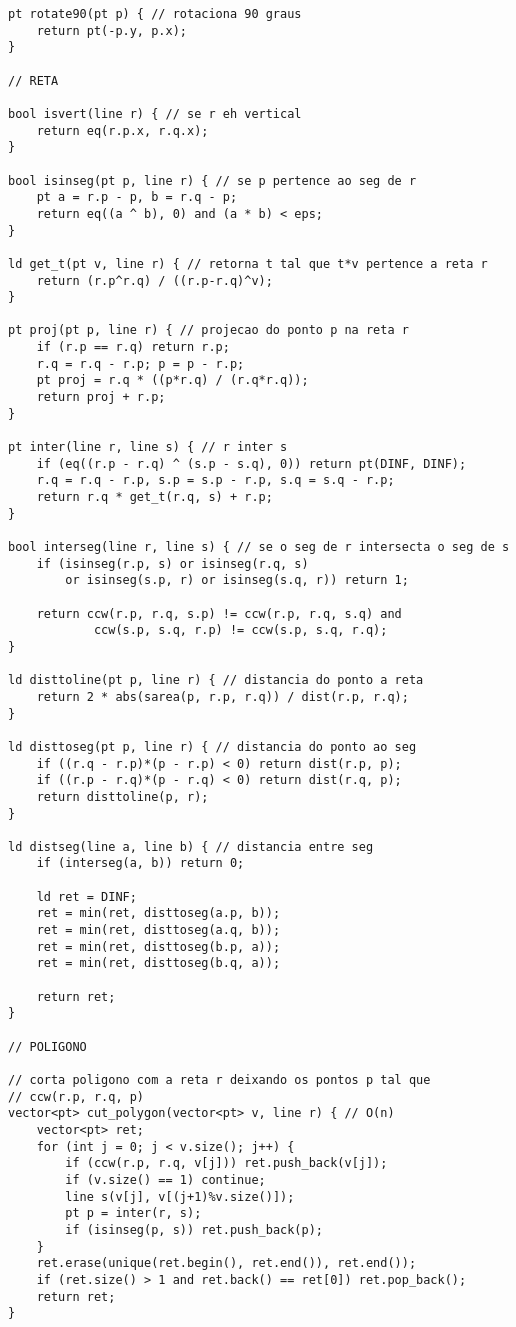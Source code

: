 \documentclass[11pt, a4paper, twoside]{article}
\begin{document}
\begin{verbatim}
pt rotate90(pt p) { // rotaciona 90 graus
	return pt(-p.y, p.x);
}

// RETA

bool isvert(line r) { // se r eh vertical
	return eq(r.p.x, r.q.x);
}

bool isinseg(pt p, line r) { // se p pertence ao seg de r
	pt a = r.p - p, b = r.q - p;
	return eq((a ^ b), 0) and (a * b) < eps;
}

ld get_t(pt v, line r) { // retorna t tal que t*v pertence a reta r
	return (r.p^r.q) / ((r.p-r.q)^v);
}

pt proj(pt p, line r) { // projecao do ponto p na reta r
	if (r.p == r.q) return r.p;
	r.q = r.q - r.p; p = p - r.p;
	pt proj = r.q * ((p*r.q) / (r.q*r.q));
	return proj + r.p;
}

pt inter(line r, line s) { // r inter s
	if (eq((r.p - r.q) ^ (s.p - s.q), 0)) return pt(DINF, DINF);
	r.q = r.q - r.p, s.p = s.p - r.p, s.q = s.q - r.p;
	return r.q * get_t(r.q, s) + r.p;
}

bool interseg(line r, line s) { // se o seg de r intersecta o seg de s
	if (isinseg(r.p, s) or isinseg(r.q, s)
		or isinseg(s.p, r) or isinseg(s.q, r)) return 1;
    
	return ccw(r.p, r.q, s.p) != ccw(r.p, r.q, s.q) and
			ccw(s.p, s.q, r.p) != ccw(s.p, s.q, r.q);
}

ld disttoline(pt p, line r) { // distancia do ponto a reta
	return 2 * abs(sarea(p, r.p, r.q)) / dist(r.p, r.q);
}

ld disttoseg(pt p, line r) { // distancia do ponto ao seg
	if ((r.q - r.p)*(p - r.p) < 0) return dist(r.p, p);
	if ((r.p - r.q)*(p - r.q) < 0) return dist(r.q, p);
	return disttoline(p, r);
}

ld distseg(line a, line b) { // distancia entre seg
	if (interseg(a, b)) return 0;
    
	ld ret = DINF;
	ret = min(ret, disttoseg(a.p, b));
	ret = min(ret, disttoseg(a.q, b));
	ret = min(ret, disttoseg(b.p, a));
	ret = min(ret, disttoseg(b.q, a));
    
	return ret;
}

// POLIGONO

// corta poligono com a reta r deixando os pontos p tal que 
// ccw(r.p, r.q, p)
vector<pt> cut_polygon(vector<pt> v, line r) { // O(n)
	vector<pt> ret;
	for (int j = 0; j < v.size(); j++) {
		if (ccw(r.p, r.q, v[j])) ret.push_back(v[j]);
		if (v.size() == 1) continue;
		line s(v[j], v[(j+1)%v.size()]);
		pt p = inter(r, s);
		if (isinseg(p, s)) ret.push_back(p);
	}
	ret.erase(unique(ret.begin(), ret.end()), ret.end());
	if (ret.size() > 1 and ret.back() == ret[0]) ret.pop_back();
	return ret;
}


\end{verbatim}
\end{document}
